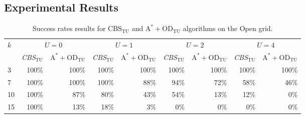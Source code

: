 \documentclass[jair,twoside,11pt,theapa]{article}
\newcommand{\timel}{w^-}
\newcommand{\timeu}{w^+}
\newcommand{\odatu}{$\mathrm{A^{*}+OD_{TU}}$\xspace}
\newcommand{\cbstu}{CBS$\mathrm{_{TU}}$\xspace}
\newcommand{\mapftu}{MAPF-TU\xspace}
\begin{document}


\subsection{Experimental Results}



\begin{table}
\resizebox{1\textwidth}{!}
{
\centering
{
\begin{tabular}{l*{8}{r}}
\toprule
$k$ & \multicolumn{2}{c}{$U = 0$} & \multicolumn{2}{c}{$U = 1$} & \multicolumn{2}{c}{$U = 2$} & \multicolumn{2}{c}{$U = 4$} \\
\cmidrule(lr){2-3}\cmidrule(lr){4-5}\cmidrule(lr){6-7}\cmidrule(lr){8-9}
 & \emph{\cbstu} & \emph{\odatu} & \emph{\cbstu} & \emph{\odatu} & \emph{\cbstu} & \emph{\odatu} & \emph{\cbstu} & \emph{\odatu} \\ \midrule
3   & 100\%  & 100\%   & 100\%  & 100\%   & 100\%  & 100\%   & 100\%  & 100\%   \\
7   & 100\%  & 100\%   & 100\%  & 88\%  & 94\%   & 72\%  & 58\%   & 46\%  \\
10  & 100\%  & 87\%  & 80\%   & 43\%  & 54\%   & 13\%  & 12\%   & 0\%  \\
15  & 100\%   & 13\%  & 18\%   & 3\%  & 0\%  & 0\%   & 0\%   & 0\%   \\ \bottomrule
\end{tabular}
}
}
\caption{Success rates results for \cbstu and \odatu algorithms on the Open grid.}
\label{tab:success-rate-1}
\end{table}
\end{document}
